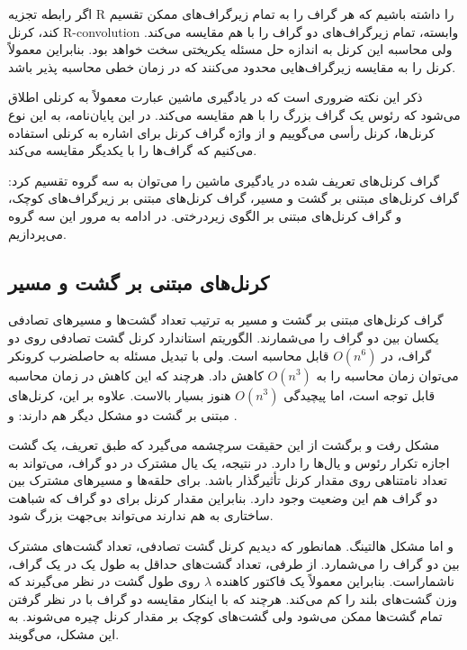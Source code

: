 اگر رابطه تجزیه R را داشته باشیم که هر گراف را به تمام زیرگراف‌های ممکن تقسیم کند، کرنل R-convolution وابسته، تمام زیرگراف‌های دو گراف را با هم مقایسه می‌کند. ولی محاسبه این کرنل به اندازه حل مسئله یکریختی سخت خواهد بود. بنابراین معمولاً کرنل را به مقایسه زیرگراف‌هایی محدود می‌کنند که در زمان خطی محاسبه پذیر باشد.

ذکر این نکته ضروری است که در یادگیری ماشین عبارت  معمولاً به کرنلی اطلاق می‌شود که رئوس یک گراف بزرگ را با هم مقایسه می‌کند. در این پایان‌نامه، به این نوع کرنل‌ها، کرنل رأسی می‌گوییم و از واژه گراف کرنل برای اشاره به کرنلی استفاده می‌کنیم که گراف‌ها را با یکدیگر مقایسه می‌کند.

گراف کرنل‌های تعریف شده در یادگیری ماشین را می‌توان به سه گروه تقسیم کرد: گراف کرنل‌های مبتنی بر گشت و مسیر، گراف کرنل‌های مبتنی بر زیرگراف‌های کوچک، و گراف کرنل‌های مبتنی بر الگوی زیردرختی. در ادامه به مرور این سه گروه می‌پردازیم.

\subsection{کرنل‌های مبتنی بر گشت و مسیر}\label{sec:random-walk-kernels}
گراف کرنل‌های مبتنی بر گشت و مسیر به ترتیب تعداد گشت‌ها و مسیرهای تصادفی یکسان بین دو گراف را می‌شمارند. الگوریتم استاندارد کرنل گشت تصادفی روی دو گراف، در $O(n^6)$  قابل محاسبه است. ولی با تبدیل مسئله به حاصلضرب کرونکر می‌توان زمان محاسبه را به $O(n^3)$ کاهش داد. هرچند که این کاهش در زمان محاسبه قابل توجه است، اما پیچیدگی $O(n^3)$ هنوز بسیار بالاست. علاوه بر این، کرنل‌های مبتنی بر گشت دو مشکل دیگر هم دارند:  و .

مشکل رفت و برگشت از این حقیقت سرچشمه می‌گیرد که طبق تعریف، یک گشت اجازه تکرار رئوس و یال‌ها را دارد. در نتیجه، یک یال مشترک در دو گراف، می‌تواند به تعداد نامتناهی روی مقدار کرنل تأثیرگذار باشد. برای حلقه‌ها و مسیرهای مشترک بین دو گراف هم این وضعیت وجود دارد. بنابراین مقدار کرنل برای دو گراف که شباهت ساختاری به هم ندارند می‌تواند بی‌جهت بزرگ شود.

و اما مشکل هالتینگ. همانطور که دیدیم کرنل گشت تصادفی، تعداد  گشت‌های مشترک بین دو گراف را می‌شمارد. از طرفی، تعداد گشت‌های حداقل به طول یک در یک گراف، ناشماراست. بنابراین معمولاً یک فاکتور کاهنده $\lambda$ روی طول گشت در نظر می‌گیرند که وزن گشت‌های بلند را کم می‌کند. هرچند که با اینکار مقایسه دو گراف با در نظر گرفتن تمام گشت‌ها ممکن می‌شود ولی گشت‌های کوچک بر مقدار کرنل چیره می‌شوند. به این مشکل،  می‌گویند.

